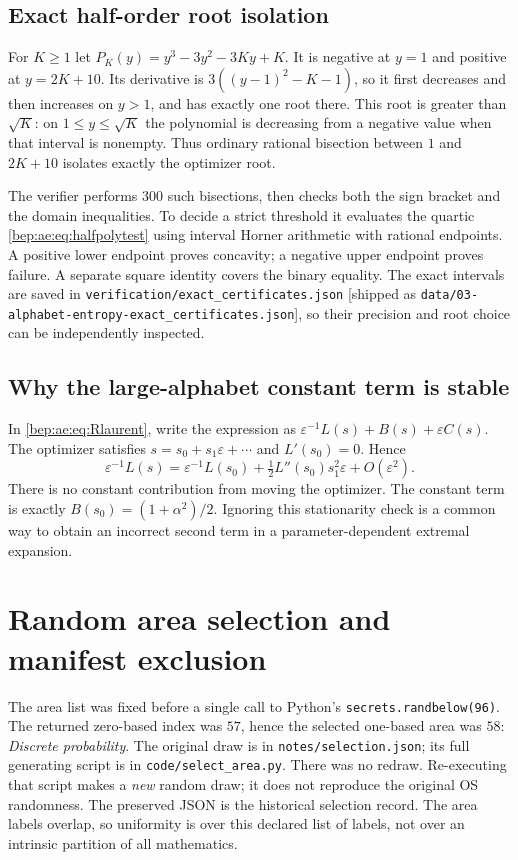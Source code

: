 \documentclass[11pt]{article}
\numberwithin{equation}{section}
\theoremstyle{definition}
\theoremstyle{remark}
\newcommand{\code}[1]{\texttt{\small #1}}
\begin{document}
\subsection{Exact half-order root isolation}
For $K\geq1$ let $P_K(y)=y^3-3y^2-3Ky+K$. It is negative at $y=1$
and positive at $y=2K+10$. Its derivative is
$3((y-1)^2-K-1)$, so it first decreases and then increases on $y>1$,
and has exactly one root there. This root is greater than $\sqrt K$:
on $1\leq y\leq\sqrt K$ the polynomial is decreasing from a negative
value when that interval is nonempty. Thus ordinary rational bisection
between $1$ and $2K+10$ isolates exactly the optimizer root.

The verifier performs 300 such bisections, then checks both the sign
bracket and the domain inequalities. To decide a strict threshold it
evaluates the quartic \eqref{bep:ae:eq:halfpolytest} using interval Horner
arithmetic with rational endpoints. A positive lower endpoint proves
concavity; a negative upper endpoint proves failure. A separate square
identity covers the binary equality. The exact intervals are saved in
\code{verification/exact\_certificates.json} [shipped as
\nolinkurl{data/03-alphabet-entropy-exact_certificates.json}], so their precision and
root choice can be independently inspected.

\subsection{Why the large-alphabet constant term is stable}
In \eqref{bep:ae:eq:Rlaurent}, write the expression as
$\varepsilon^{-1}L(s)+B(s)+\varepsilon C(s)$.
The optimizer satisfies $s=s_0+s_1\varepsilon+\cdots$ and
$L'(s_0)=0$. Hence
\[
 \varepsilon^{-1}L(s)=\varepsilon^{-1}L(s_0)
       +\tfrac12L''(s_0)s_1^2\varepsilon+O(\varepsilon^2).
\]
There is no constant contribution from moving the optimizer. The
constant term is exactly $B(s_0)=(1+\alpha^2)/2$. Ignoring this
stationarity check is a common way to obtain an incorrect second term
in a parameter-dependent extremal expansion.

\clearpage
{}
\appendix
\section{Random area selection and manifest exclusion}\label{bep:app:selection}
The area list was fixed before a single call to Python's
\texttt{secrets.randbelow(96)}. The returned zero-based index was $57$, hence
the selected one-based area was $58$: \emph{Discrete probability}.
The original draw is in \texttt{notes/selection.json}; its full generating
script is in \texttt{code/select\_area.py}. There was no redraw.
Re-executing that script makes a \emph{new} random draw; it does not reproduce
the original OS randomness. The preserved JSON is the historical selection
record. The area labels overlap, so uniformity is over this declared list
of labels, not over an intrinsic partition of all mathematics.
\end{document}
